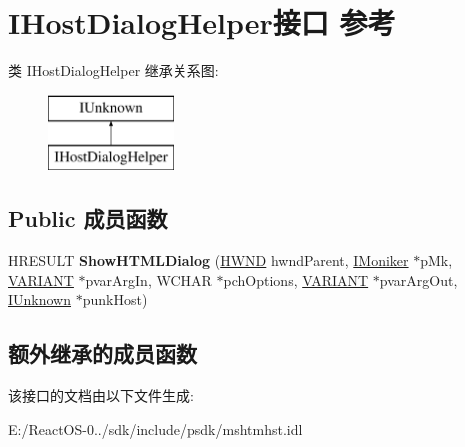 \hypertarget{interface_i_host_dialog_helper}{}\section{I\+Host\+Dialog\+Helper接口 参考}
\label{interface_i_host_dialog_helper}
类 I\+Host\+Dialog\+Helper 继承关系图\+:\begin{figure}[H]
\begin{center}
\leavevmode
\includegraphics[height=2.000000cm]{interface_i_host_dialog_helper}
\end{center}
\end{figure}
\subsection*{Public 成员函数}
\begin{DoxyCompactItemize}
\item 
\mbox{\label{interface_i_host_dialog_helper_a06dcee3015b312d32893716baa521d17}} 
H\+R\+E\+S\+U\+LT {\bfseries Show\+H\+T\+M\+L\+Dialog} (\hyperlink{interfacevoid}{H\+W\+ND} hwnd\+Parent, \hyperlink{interface_i_moniker}{I\+Moniker} $\ast$p\+Mk, \hyperlink{structtag_v_a_r_i_a_n_t}{V\+A\+R\+I\+A\+NT} $\ast$pvar\+Arg\+In, W\+C\+H\+AR $\ast$pch\+Options, \hyperlink{structtag_v_a_r_i_a_n_t}{V\+A\+R\+I\+A\+NT} $\ast$pvar\+Arg\+Out, \hyperlink{interface_i_unknown}{I\+Unknown} $\ast$punk\+Host)
\end{DoxyCompactItemize}
\subsection*{额外继承的成员函数}


该接口的文档由以下文件生成\+:\begin{DoxyCompactItemize}
\item 
E\+:/\+React\+O\+S-\/0../sdk/include/psdk/mshtmhst.\+idl\end{DoxyCompactItemize}
